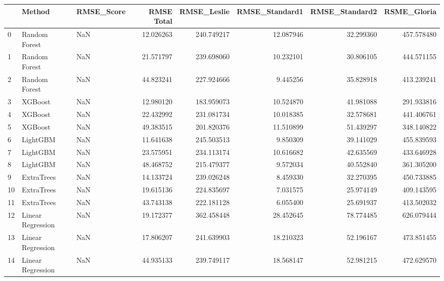 \begin{tabular}{lllrrrrr}
\toprule
{} &             Method & RMSE\_Score &  RMSE Total &  RMSE\_Leslie &  RMSE\_Standard1 &  RMSE\_Standard2 &  RSME\_Gloria \\
\midrule
0  &      Random Forest &        NaN &   12.026263 &   240.749217 &       12.087946 &       32.299360 &   457.578480 \\
1  &      Random Forest &        NaN &   21.571797 &   239.698060 &       10.232101 &       30.806105 &   444.571155 \\
2  &      Random Forest &        NaN &   44.823241 &   227.924666 &        9.445256 &       35.828918 &   413.239241 \\
3  &            XGBoost &        NaN &   12.980120 &   183.959073 &       10.524870 &       41.981088 &   291.933816 \\
4  &            XGBoost &        NaN &   22.432992 &   231.081734 &       10.018385 &       32.578681 &   441.406761 \\
5  &            XGBoost &        NaN &   49.383515 &   201.820376 &       11.510899 &       51.439297 &   348.140822 \\
6  &           LightGBM &        NaN &   11.641638 &   245.503513 &        9.850309 &       39.141029 &   455.839593 \\
7  &           LightGBM &        NaN &   23.575951 &   234.113174 &       10.616682 &       42.635569 &   433.646928 \\
8  &           LightGBM &        NaN &   48.468752 &   215.479377 &        9.572034 &       40.552840 &   361.305200 \\
9  &         ExtraTrees &        NaN &   14.133724 &   239.026248 &        8.459330 &       32.270395 &   450.733885 \\
10 &         ExtraTrees &        NaN &   19.615136 &   224.835697 &        7.031575 &       25.974149 &   409.143595 \\
11 &         ExtraTrees &        NaN &   43.743138 &   222.181128 &        6.055400 &       25.691937 &   413.502032 \\
12 &  Linear Regression &        NaN &   19.172377 &   362.458448 &       28.452645 &       78.774485 &   626.079444 \\
13 &  Linear Regression &        NaN &   17.806207 &   241.639903 &       18.210323 &       52.196167 &   473.851455 \\
14 &  Linear Regression &        NaN &   44.935133 &   239.749117 &       18.568147 &       52.981215 &   472.629570 \\
\bottomrule
\end{tabular}
